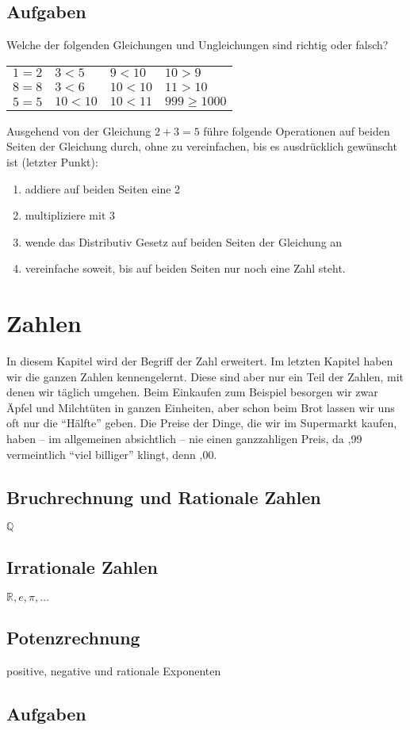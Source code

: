 \section{Aufgaben}
\begin{prob}
\label{arith.1.1}

Welche der folgenden Gleichungen und Ungleichungen sind richtig oder falsch?
\begin{center}
\begin{tabular}{C{2cm}C{2cm}C{2cm}C{2cm}}
$1=2$ & $3<5$ & $9<10$ & $10>9$ \\
$8=8$ & $3<6$ & $10<10$ & $11>10$ \\
$5=5$ & $10<10$ & $10<11$ & $999 \ge 1000$ 
\end{tabular}
\end{center}
\end{prob}

\begin{prob}
\label{arith.1.2}
Ausgehend von der Gleichung $2+3=5$ führe folgende Operationen auf beiden Seiten der Gleichung durch, ohne zu vereinfachen, bis es ausdrücklich gewünscht ist (letzter Punkt):
\begin{enumerate}
\item addiere auf beiden Seiten eine 2
\item multipliziere mit 3
\item wende das Distributiv Gesetz auf beiden Seiten der Gleichung an
\item vereinfache soweit, bis auf beiden Seiten nur noch eine Zahl steht.
\end{enumerate}
\end{prob}



\chapter{Zahlen}

In diesem Kapitel wird der Begriff der Zahl erweitert. Im letzten Kapitel haben wir die ganzen Zahlen kennengelernt. Diese sind aber nur ein Teil der Zahlen, mit denen wir täglich umgehen. Beim Einkaufen zum Beispiel besorgen wir zwar Äpfel und Milchtüten in ganzen Einheiten, aber schon beim Brot lassen wir uns oft nur die "`Hälfte"' geben. Die Preise der Dinge, die wir im Supermarkt kaufen, haben -- im allgemeinen absichtlich -- nie einen ganzzahligen Preis, da ,99 vermeintlich "`viel billiger"' klingt, denn ,00.


\section{Bruchrechnung und Rationale Zahlen}

$\mathbb{Q}$

\section{Irrationale Zahlen}

$\mathbb{R}, e, \pi, \dots $

\section{Potenzrechnung}

positive, negative und rationale Exponenten


\section{Aufgaben}

